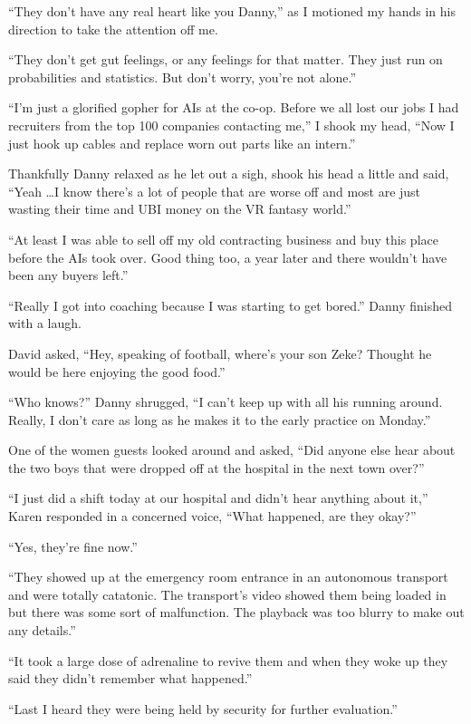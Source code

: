 ``They don't have any real heart like you Danny,'' as I
motioned my hands in his direction to take the attention off
me.

``They don't get gut feelings, or any feelings for that matter.
They just run on probabilities and statistics. But don't worry,
you're not alone.''

``I'm just a glorified gopher for AIs at the co-op. Before we
all lost our jobs I had recruiters from the top 100 companies
contacting me,'' I shook my head, ``Now I just hook up cables
and replace worn out parts like an intern.''

Thankfully Danny relaxed as he let out a sigh, shook his head a
little and said, ``Yeah \ldots I know there's a lot of people
that are worse off and most are just wasting their time and
UBI money on the VR fantasy world.''

``At least I was able to sell off my old contracting business
and buy this place before the AIs took over. Good thing too, a
year later and there wouldn't have been any buyers left.''

``Really I got into coaching because I was starting to get
bored.'' Danny finished with a laugh.

David asked, ``Hey, speaking of football, where's your son Zeke?
Thought he would be here enjoying the good food.''

``Who knows?'' Danny shrugged, ``I can't keep up with all his
running around. Really, I don't care as long as he makes it
to the early practice on Monday.''

One of the women guests looked around and asked, ``Did anyone else hear
about the two boys that were dropped off at the hospital in the
next town over?''

``I just did a shift today at our hospital and didn't
hear anything about it,'' Karen responded in a concerned voice,
``What happened, are they okay?''

``Yes, they're fine now.''

``They showed up at the emergency room entrance in an autonomous
transport and were totally catatonic. The transport's video
showed them being loaded in but there was some sort of
malfunction. The playback was too blurry to make out any
details.''

``It took a large dose of adrenaline to revive them and when
they woke up they said they didn't remember what happened.''

``Last I heard they were being held by security for further
evaluation.''

